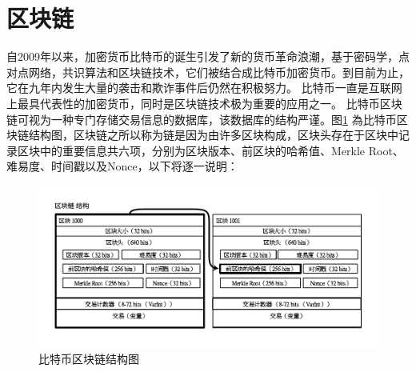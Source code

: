 		\section{区块链}
		自2009年以来，加密货币比特币的诞生引发了新的货币革命浪潮，基于密码学，点对点网络，共识算法和区块链技术，它们被结合成比特币加密货币。到目前为止，它在九年内发生大量的袭击和欺诈事件后仍然在积极努力。 比特币一直是互联网上最具代表性的加密货币，同时是区块链技术极为重要的应用之一。
		比特币区块链可视为一种专门存储交易信息的数据库，该数据库的结构严谨。图\ref{blockchain} 為⽐特币区块链结构图，区块链之所以称为链是因为由许多区块构成，区块头存在于区块中记录区块中的重要信息共六项，分别为区块版本、前区块的哈希值、Merkle Root、难易度、时间戳以及Nonce，以下将逐一说明：

			\begin{figure}[!htbp]
				\centering
				\includegraphics[width = 1\textwidth]{blockchain.pdf}
				\caption{比特币区块链结构图}\label{blockchain}
			\end{figure}

